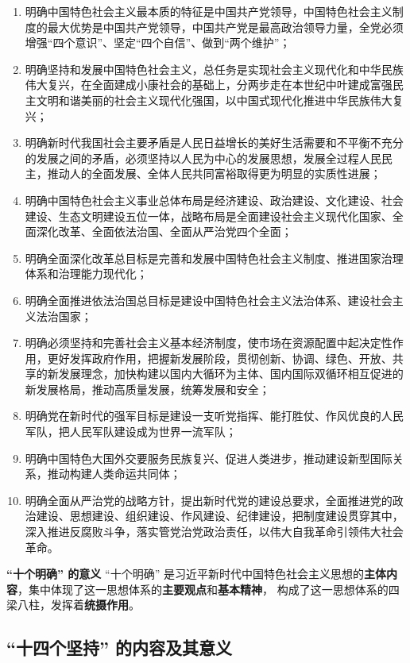 \documentclass[UTF8,10pt]{ctexbook} %
\begin{document}
\begin{enumerate}[itemsep=0pt, label=(\arabic*)]
    \item 明确中国特色社会主义最本质的特征是中国共产党领导，中国特色社会主义制度的最大优势是中国共产党领导，中国共产党是最高政治领导力量，全党必须增强“四个意识”、坚定“四个自信”、做到“两个维护”；
    \item 明确坚持和发展中国特色社会主义，总任务是实现社会主义现代化和中华民族伟大复兴，在全面建成小康社会的基础上，分两步走在本世纪中叶建成富强民主文明和谐美丽的社会主义现代化强国，以中国式现代化推进中华民族伟大复兴；
    \item 明确新时代我国社会主要矛盾是人民日益增长的美好生活需要和不平衡不充分的发展之间的矛盾，必须坚持以人民为中心的发展思想，发展全过程人民民主，推动人的全面发展、全体人民共同富裕取得更为明显的实质性进展；
    \item 明确中国特色社会主义事业总体布局是经济建设、政治建设、文化建设、社会建设、生态文明建设五位一体，战略布局是全面建设社会主义现代化国家、全面深化改革、全面依法治国、全面从严治党四个全面；
    \item 明确全面深化改革总目标是完善和发展中国特色社会主义制度、推进国家治理体系和治理能力现代化；
    \item 明确全面推进依法治国总目标是建设中国特色社会主义法治体系、建设社会主义法治国家；
    \item 明确必须坚持和完善社会主义基本经济制度，使市场在资源配置中起决定性作用，更好发挥政府作用，把握新发展阶段，贯彻创新、协调、绿色、开放、共享的新发展理念，加快构建以国内大循环为主体、国内国际双循环相互促进的新发展格局，推动高质量发展，统筹发展和安全；
    \item 明确党在新时代的强军目标是建设一支听党指挥、能打胜仗、作风优良的人民军队，把人民军队建设成为世界一流军队；
    \item 明确中国特色大国外交要服务民族复兴、促进人类进步，推动建设新型国际关系，推动构建人类命运共同体；
    \item 明确全面从严治党的战略方针，提出新时代党的建设总要求，全面推进党的政治建设、思想建设、组织建设、作风建设、纪律建设，把制度建设贯穿其中，深入推进反腐败斗争，落实管党治党政治责任，以伟大自我革命引领伟大社会革命。
\end{enumerate}

\textbf{“十个明确” 的意义} \quad“十个明确” 是习近平新时代中国特色社会主义思想的\textbf{主体内容}，集中体现了这一思想体系的\textbf{主要观点}和\textbf{基本精神}，
构成了这一思想体系的四梁八柱，发挥着\textbf{统摄作用}。

\subsection{“十四个坚持” 的内容及其意义}
\end{document}
